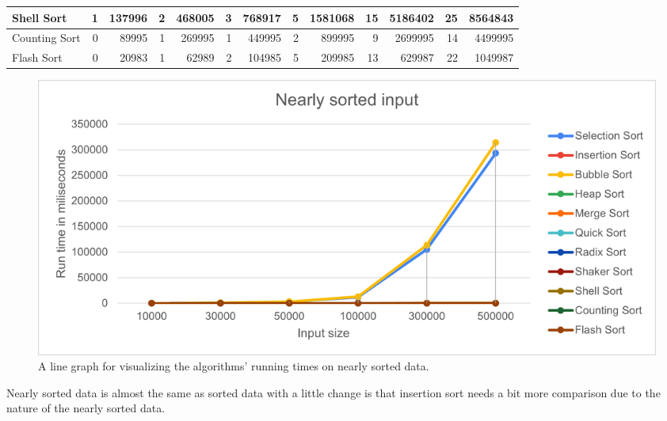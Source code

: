 \documentclass{article}
\newcommand\tab[1][0.5cm]{\hspace*{#1}}
\begin{document}
\begin{table}[H]
\begin{adjustbox}{width=\columnwidth,center}
\begin{tabular}{|l|rrrrrrrrrrrr|}
Shell Sort        & \multicolumn{1}{r|}{1}            & \multicolumn{1}{r|}{137996}     & \multicolumn{1}{r|}{2}            & \multicolumn{1}{r|}{468005}     & \multicolumn{1}{r|}{3}            & \multicolumn{1}{r|}{768917}     & \multicolumn{1}{r|}{5}            & \multicolumn{1}{r|}{1581068}    & \multicolumn{1}{r|}{15}           & \multicolumn{1}{r|}{5186402}     & \multicolumn{1}{r|}{25}           & 8564843                         \\ \hline
Counting Sort     & \multicolumn{1}{r|}{0}            & \multicolumn{1}{r|}{89995}      & \multicolumn{1}{r|}{1}            & \multicolumn{1}{r|}{269995}     & \multicolumn{1}{r|}{1}            & \multicolumn{1}{r|}{449995}     & \multicolumn{1}{r|}{2}            & \multicolumn{1}{r|}{899995}     & \multicolumn{1}{r|}{9}            & \multicolumn{1}{r|}{2699995}     & \multicolumn{1}{r|}{14}           & 4499995                         \\ \hline
Flash Sort        & \multicolumn{1}{r|}{0}            & \multicolumn{1}{r|}{20983}      & \multicolumn{1}{r|}{1}            & \multicolumn{1}{r|}{62989}      & \multicolumn{1}{r|}{2}            & \multicolumn{1}{r|}{104985}     & \multicolumn{1}{r|}{5}            & \multicolumn{1}{r|}{209985}     & \multicolumn{1}{r|}{13}           & \multicolumn{1}{r|}{629987}      & \multicolumn{1}{r|}{22}           & 1049987                         \\ \hline
\end{tabular}
\end{adjustbox}
\end{table}
\begin{figure}[H]
\includegraphics[scale = 0.8]{NSortedLines.png}
\caption{ A line graph for visualizing the algorithms’ running times on nearly sorted data.}
\centering
\end{figure}

\tab Nearly sorted data  is almost the same as sorted data with a little change is that insertion sort needs a bit more comparison due to the nature of the nearly sorted data.
\end{document}
